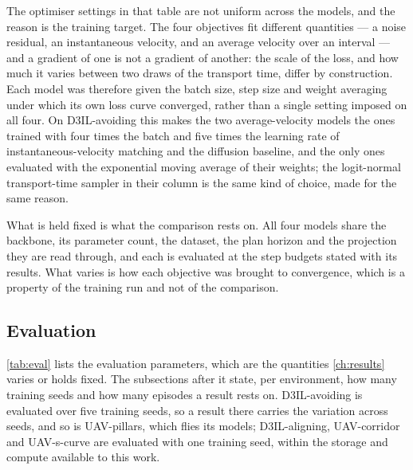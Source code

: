 The optimiser settings in that table are not uniform across the models, and the reason is the training
target. The four objectives fit different quantities --- a noise residual, an instantaneous velocity, and
an average velocity over an interval --- and a gradient of one is not a gradient of another: the scale of
the loss, and how much it varies between two draws of the transport time, differ by construction. Each
model was therefore given the batch size, step size and weight averaging under which its own loss curve
converged, rather than a single setting imposed on all four. On D3IL-avoiding this makes the two
average-velocity models the ones trained with four times the batch and five times the learning rate of
instantaneous-velocity matching and the diffusion baseline, and the only ones evaluated with the
exponential moving average of their weights; the logit-normal transport-time sampler in their column is
the same kind of choice, made for the same reason.

What is held fixed is what the comparison rests on. All four models share the backbone, its parameter
count, the dataset, the plan horizon and the projection they are read through, and each is evaluated at
the step budgets stated with its results. What varies is how each objective was brought to convergence,
which is a property of the training run and not of the comparison.

\subsection{Evaluation}\label{sec:setup:protocol:eval}

\autoref{tab:eval} lists the evaluation parameters, which are the quantities \autoref{ch:results} varies or
holds fixed. The subsections after it state, per environment, how many training seeds and how many episodes
a result rests on. D3IL-avoiding is evaluated over five training seeds, so a result there carries the variation across seeds,
and so is UAV-pillars, which flies its models; D3IL-aligning, UAV-corridor and UAV-s-curve are evaluated
with one training seed, within the storage and compute available to this work.


